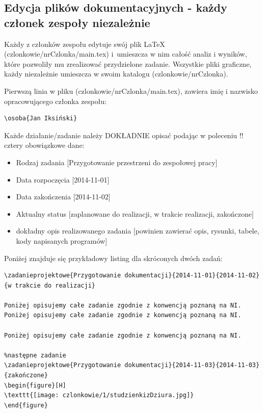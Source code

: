 \subsection[Edycja plików dokumentacyjnych]{Edycja plików dokumentacyjnych - każdy członek zespoły niezależnie}
Każdy z członków zespołu edytuje swój plik \LaTeX{} (czlonkowie/nrCzlonka/main.tex) i~umieszcza w nim całość analiz i wyników, które pozwoliły mu zrealizować przydzielone zadanie. Wszystkie pliki graficzne, każdy niezależnie umieszcza w swoim katalogu (czlonkowie/nrCzlonka).

Pierwszą linia w pliku (czlonkowie/nrCzlonka/main.tex), zawiera imię i nazwisko opracowującego członka zespołu:
\begin{lstlisting}
\osoba{Jan Iksiński}
\end{lstlisting}

Każde działanie/zadanie należy DOKŁADNIE opisać podając w poleceniu \s!\zadanieprojektowe! cztery obowiązkowe dane:
\begin{itemize}
\item Rodzaj zadania [Przygotowanie przestrzeni do zespołowej pracy]
\item Data rozpoczęcia [2014-11-01]
\item Data zakończenia [2014-11-02]
\item Aktualny status [zaplanowane do realizacji, w trakcie realizacji, zakończone]
\item dokładny opis realizowanego zadania [powinien zawierać opis, rysunki, tabele, kody napisanych programów]
\end{itemize}

Poniżej znajduje się przykładowy listing dla skróconych dwóch zadań:
\begin{lstlisting}
\zadanieprojektowe{Przygotowanie dokumentacji}{2014-11-01}{2014-11-02}{w trakcie do realizacji}

Poniżej opisujemy całe zadanie zgodnie z konwencją poznaną na NI.
Poniżej opisujemy całe zadanie zgodnie z konwencją poznaną na NI.

Poniżej opisujemy całe zadanie zgodnie z konwencją poznaną na NI. 

%następne zadanie
\zadanieprojektowe{Przygotowanie dokumentacji}{2014-11-03}{2014-11-03}{zakończone}
\begin{figure}[H]
\texttt{[image: czlonkowie/1/studzienkizDziura.jpg]}
\end{figure}
\end{lstlisting}


